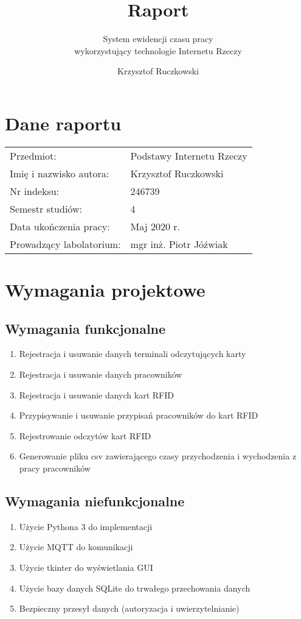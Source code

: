\documentclass[12pt,a4paper]{article}
\author{Krzysztof Ruczkowski}
\title{Raport}
\subtitle{System ewidencji czasu pracy\\wykorzystujący technologie Internetu Rzeczy}
\begin{document}
\maketitle
\newpage
\tableofcontents
\newpage

\section{Dane raportu}

\begin{tabular}{ll}
Przedmiot: & Podstawy Internetu Rzeczy\\
Imię i nazwisko autora: & Krzysztof Ruczkowski\\
Nr indeksu: & 246739\\
Semestr studiów: & 4\\
Data ukończenia pracy: & Maj 2020 r.\\
Prowadzący labolatorium: & mgr inż. Piotr Jóźwiak\\
\end{tabular}

\section{Wymagania projektowe}

\subsection{Wymagania funkcjonalne}

\begin{enumerate}
  \item Rejestracja i usuwanie danych terminali odczytujących karty
  \item Rejestracja i usuwanie danych pracowników
  \item Rejestracja i usuwanie danych kart RFID
  \item Przypisywanie i usuwanie przypisań pracowników do kart RFID
  \item Rejestrowanie odczytów kart RFID
  \item Generowanie pliku csv zawierającego czasy przychodzenia i wychodzenia z pracy pracowników
\end{enumerate}

\subsection{Wymagania niefunkcjonalne}
\begin{enumerate}
  \item Użycie Pythona 3 do implementacji
  \item Użycie MQTT do komunikacji
  \item Użycie tkinter do wyświetlania GUI
  \item Użycie bazy danych SQLite do trwałego przechowania danych
  \item Bezpieczny przesył danych (autoryzacja i uwierzytelnianie)
\end{enumerate}
\end{document}
